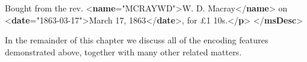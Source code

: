 \begin{shaded}
\hspace*{1em}\hspace*{1em}Bought from the rev. {<\textbf{name}\hspace*{1em}{key}="{MCRAYWD}">}W. D. Macray{</\textbf{name}>} on {<\textbf{date}\hspace*{1em}{when}="{1863-03-17}">}March 17, 1863{</\textbf{date}>}, for £1 10s.{</\textbf{p}>}\mbox{}\newline 
\hspace*{1em}\mbox{}\newline 
{}\mbox{}\newline 
{</\textbf{msDesc}>}\end{shaded}\egroup\par \noindent  In the remainder of this chapter we discuss all of the encoding features demonstrated above, together with many other related matters.
